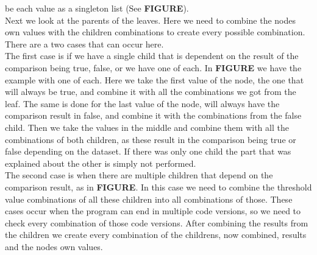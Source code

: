 be each value as a singleton list (See \textbf{FIGURE}).\\
Next we look at the parents of the leaves. Here we need to combine the nodes
own values with the children combinations to create every possible
combination. There are a two cases that can occur here. \\
The first case is if we have a single child that is dependent on the result of
the comparison being true, false, or we have one of each. In
\textbf{FIGURE} we have the example with one of each. Here we take the first
value of the node, the one that will always be true, and combine it with all
the combinations we got from the leaf. The same is done for the last value of
the node, will always have the comparison result in false, and combine it with
the combinations from the false child. Then we take the values in the middle
and combine them with all the combinations of both children, as these result in
the comparison being true or false depending on the dataset. If there was only
one child the part that was explained about the other is simply not performed.\\
The second case is when 
there are multiple children that depend on the comparison result, as in
\textbf{FIGURE}. In this case we need to combine the threshold value
combinations of all these children into all combinations of those. These cases
occur when the program can end in multiple code versions, so we need to check
every combination of those code versions. After combining the results from the
children we create every combination of the childrens, now combined, results
and the nodes own values. 


